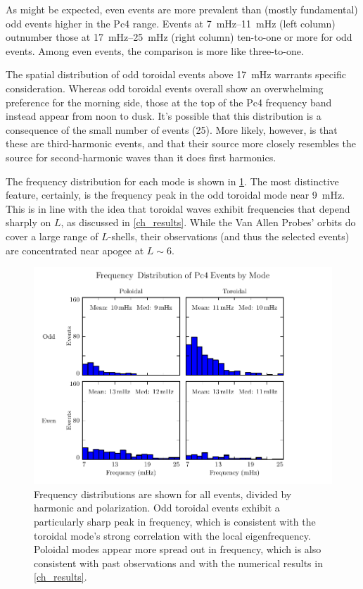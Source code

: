 
As might be expected, even events are more prevalent than (mostly fundamental)
odd events higher in the Pc4 range. Events at \SIrange{7}{11}{\mHz} (left
column) outnumber those at \SIrange{17}{25}{\mHz} (right column) ten-to-one or
more for odd events. Among even events, the comparison is more like
three-to-one. 

The spatial distribution of odd toroidal events above \SI{17}{\mHz} warrants
specific consideration. Whereas odd toroidal events overall show an
overwhelming preference for the morning side, those at the top of the Pc4
frequency band instead appear from noon to dusk. It's possible that this
distribution is a consequence of the small number of events (25). More likely,
however, is that these are third-harmonic events, and that their source more
closely resembles the source for second-harmonic waves than it does first
harmonics. 


The frequency distribution for each mode is shown in \cref{fig_f}. The most
distinctive feature, certainly, is the frequency peak in the odd toroidal mode
near \SI{9}{\mHz}. This is in line with the idea that toroidal waves exhibit
frequencies that depend sharply on $L$, as discussed in \cref{ch_results}.
While the Van Allen Probes' orbits do cover a large range of $L$-shells, their
observations (and thus the selected events) are concentrated near apogee at
$L \sim 6$. 

\begin{figure}[!htb]
  \centering
  \includegraphics[width=\textwidth]{figures/f.pdf}
  \caption[Frequency Distribution of Pc4 Events by Mode]{
    Frequency distributions are shown for all events, divided by harmonic and
    polarization. Odd toroidal events exhibit a particularly sharp peak in
    frequency, which is consistent with the toroidal mode's strong correlation
    with the local eigenfrequency. Poloidal modes appear more spread out in
    frequency, which is also consistent with past observations and with the
    numerical results in \cref{ch_results}. 
  }
  \label{fig_f}
\end{figure}

